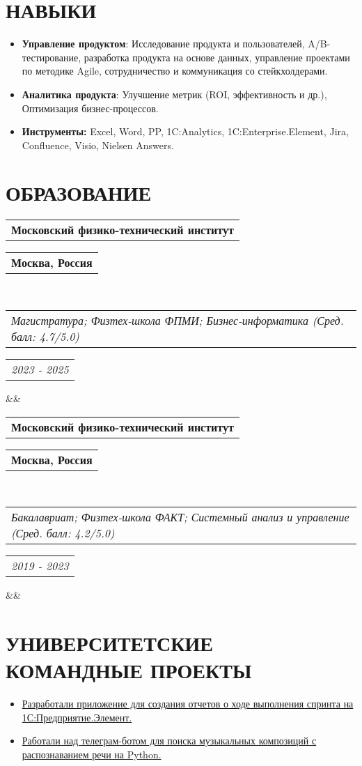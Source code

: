 \documentclass[11pt,a4paper,sans]{moderncv}        %
\makeatletter
\newcommand*{\customcventry}[7][.25em]{
  \begin{tabular}{@{}l} 
    {\bfseries #4}
  \end{tabular}
  \hfill%
  \begin{tabular}{l@{}}
     {\bfseries #5}
  \end{tabular} \\
  \begin{tabular}{@{}l} 
    {\itshape #3}
  \end{tabular}
  \hfill%
  \begin{tabular}{l@{}}
     {\itshape #2}
  \end{tabular}
  \ifx&#7&%
  \else{\\%
    \begin{minipage}{\maincolumnwidth}%
      \small#7%
    \end{minipage}}\fi%
  \par\addvspace{#1}}
\makeatother
\begin{document}
\section{НАВЫКИ}
\begin{itemize}
\item \textbf{Управление продуктом}: Исследование продукта и пользователей, A/B-тестирование, разработка продукта на основе данных, управление проектами по методике Agile, сотрудничество и коммуникация со стейкхолдерами.
\item \textbf{Аналитика продукта}: Улучшение метрик (ROI, эффективность и др.), Оптимизация бизнес-процессов.
\item \textbf{Инструменты:} Excel, Word, PP, 1C:Analytics, 1C:Enterprise.Element, Jira, Confluence, Visio, Nielsen Answers.
\end{itemize}

\section{ОБРАЗОВАНИЕ}
{\customcventry{2023 - 2025}{Магистратура; Физтех-школа ФПМИ; Бизнес-информатика (Сред. балл: 4.7/5.0)}{Московский физико-технический институт}{Москва, Россия}{}{}}
{\customcventry{2019 - 2023}{Бакалавриат; Физтех-школа ФАКТ; Системный анализ и управление (Сред. балл: 4.2/5.0)}{Московский физико-технический институт}{Москва, Россия}{}{}}

\section{УНИВЕРСИТЕТСКИЕ КОМАНДНЫЕ ПРОЕКТЫ}
{
  {\begin{itemize}
  \item \href{https://disk.yandex.com/d/EUMrDL89-MqzmQ}{Разработали приложение для создания отчетов о ходе выполнения спринта на 1С:Предприятие.Элемент.}
  \item \href{https://github.com/alievgithub/SpeechRecognitionBot}{Работали над телеграм-ботом для поиска музыкальных композиций с распознаванием речи на Python.}
  \end{itemize}
  }
}





\end{document}

